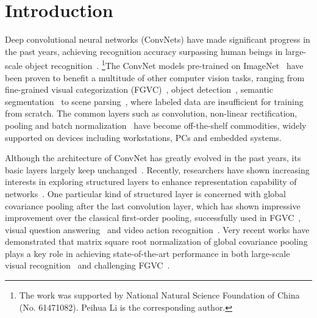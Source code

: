 \documentclass[10pt,twocolumn,letterpaper]{article}
\begin{document}
\section{Introduction}

Deep convolutional neural networks (ConvNets) have made significant progress in the past years, achieving recognition accuracy surpassing human beings in large-scale object recognition~\cite{He_2015_ICCV}.{ \let\thefootnote\relax\footnote{The work was supported by National Natural Science Foundation of China (No. 61471082). Peihua Li is the corresponding author.}}The ConvNet models pre-trained on ImageNet~\cite{imagenet_cvpr09} have been proven to benefit a multitude of other computer vision tasks, ranging from fine-grained visual categorization (FGVC)~\cite{lin2015bilinear}, object detection~\cite{Redmon_2017_CVPR}, semantic segmentation~\cite{Long_2015_CVPR} to scene parsing~\cite{zhou2017scene},   where labeled data are insufficient for training from scratch. The common layers such as convolution, non-linear rectification, pooling and batch normalization~\cite{DBLP:journals/corr/IoffeS15} have  become off-the-shelf commodities, widely supported on devices including workstations, PCs and embedded systems. 


Although the architecture of ConvNet has greatly evolved in the past years, its basic layers  largely keep unchanged~\cite{LeNet1989,Krizhevsky2012ImageNet}.  Recently, researchers have shown increasing interests in exploring structured layers to  enhance representation capability of networks~\cite{Ionescu_2015_ICCV,lin2015bilinear,Arandjelovic_2016_CVPR,LiYunSheng_2017_ICCV}. One particular kind of structured layer is concerned with global covariance pooling after the last convolution layer, which has shown impressive improvement over the classical first-order pooling, successfully used in FGVC~\cite{lin2015bilinear},  visual question answering~\cite{Kafle_2017_ICCV} and  video action recognition~\cite{WangYunbo_2017_CVPR}.   Very recent works  have demonstrated that  matrix square root normalization of global covariance pooling plays a key role in achieving state-of-the-art performance in both large-scale visual recognition~\cite{Li_2017_ICCV} and  challenging FGVC~\cite{lin2017improved,Wang_2017_CVPR}.  
\end{document}
